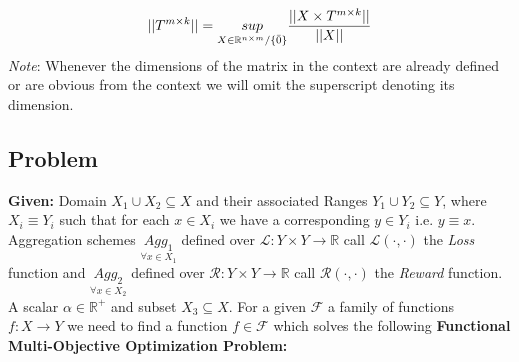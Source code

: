 \begin{equation}
   ||T^{m\times k}|| = \underset{X \in \mathbb{R}^{n\times m}/\{\Bar{0}\}}{sup} \frac{||X\times T^{m\times k}||}{||X||}
\end{equation}
\textit{Note}: Whenever the dimensions of the matrix in the context are already defined or are obvious from the context we will omit the superscript denoting its dimension.
\subsection{Problem} \label{prob_def}
\textbf{Given:}
\newline Domain $X_1\cup X_2 \subseteq X$ and their associated Ranges $Y_1\cup Y_2 \subseteq Y$, where $X_i\equiv Y_i$ such that for each $x \in X_i$ we have a corresponding $y \in Y_i$ i.e. $y\equiv x$.
\newline Aggregation schemes $\underset{\forall x\in X_1}{Agg_1}$ defined over $\mathcal{L}: Y \times Y \to \mathbb{R}$ call $\mathcal{L}(\cdot,\cdot)$ the \textit{Loss} function and $\underset{\forall x\in X_2}{Agg_2}$ defined over $\mathcal{R}: Y \times Y \to \mathbb{R}$ call $\mathcal{R}(\cdot,\cdot)$  the \textit{Reward} function.\newline
A scalar $\alpha \in \mathbb{R^+}$ and subset $X_3 \subseteq X$.\newline
For a given $\mathcal{F}$ a family of functions $f: X \to Y$ we need to find a function $f \in \mathcal{F}$ which solves the following \newline\newline \textbf{Functional Multi-Objective Optimization Problem:}

